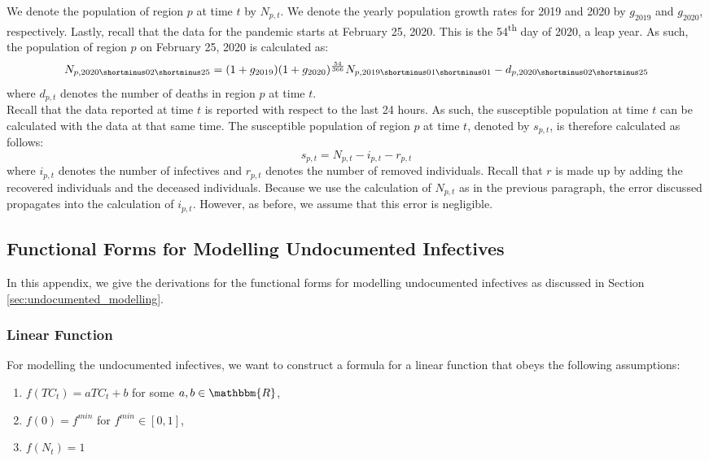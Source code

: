 \documentclass[12pt]{article}
\newcommand{\R}{\mathbbm{R}}
\begin{document}
\begin{appendices}
		We denote the population of region $p$ at time $t$ by $N_{p,t}$. We denote the yearly population growth rates for 2019 and 2020 by $g_{2019}$ and $g_{2020}$, respectively. Lastly, recall that the data for the pandemic starts at February 25, 2020. This is the 54\textsuperscript{th} day of 2020, a leap year. As such, the population of region $p$ on February 25, 2020 is calculated as:
		\begin{equation}\label{eq:calc_total_population}
		    N_{p, 2020\shortminus02\shortminus25} = (1+g_{2019})(1+g_{2020})^{\frac{54}{366}}N_{p, 2019\shortminus01\shortminus01} - d_{p, 2020\shortminus02\shortminus25}
		\end{equation}
		where $d_{p,t}$ denotes the number of deaths in region $p$ at time $t$. \\
		
		Recall that the data reported at time $t$ is reported with respect to the last 24 hours. As such, the susceptible population at time $t$ can be calculated with the data at that same time. The susceptible population of region $p$ at time $t$, denoted by $s_{p,t}$, is therefore calculated as follows:
		\begin{equation}\label{eq:calc_susceptible_population}
		    s_{p,t} = N_{p,t} - i_{p,t} - r_{p,t}
		\end{equation}
		where $i_{p,t}$ denotes the number of infectives and $r_{p,t}$ denotes the number of removed individuals. Recall that $r$ is made up by adding the recovered individuals and the deceased individuals. Because we use the calculation of $N_{p,t}$ as in the previous paragraph, the error discussed propagates into the calculation of $i_{p,t}$. However, as before, we assume that this error is negligible.
		
		\subsection{Functional Forms for Modelling Undocumented Infectives}\label{sapp:derivation_undocumented_infectives}
		In this appendix, we give the derivations for the functional forms for modelling undocumented infectives as discussed in Section \ref{sec:undocumented_modelling}.
		
		\subsubsection{Linear Function} \label{ssapp:linear_derivation}
		For modelling the undocumented infectives, we want to construct a formula for a linear function that obeys the following assumptions:
		\begin{enumerate}[label=(\Roman*)]
		    \item\label{ass:linear_formula} $f(TC_t) = aTC_t + b$  for some $a, b \in \R$,
		    \item\label{ass:linear_0} $f(0) = f^{min}$ for $f^{min} \in [0,1]$,
		    \item\label{ass:linear_N} $f(N_t) = 1$
		\end{enumerate}
		

\end{appendices}
\end{document}
